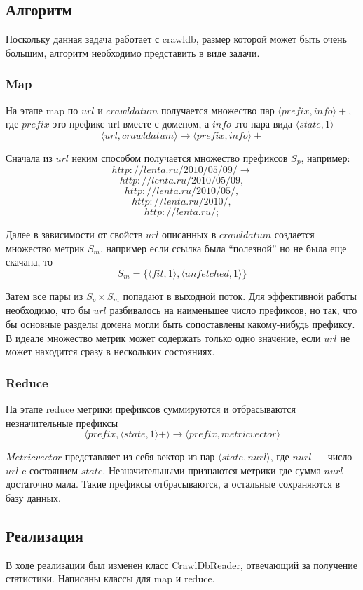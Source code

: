 \subsection*{Алгоритм}
Поскольку данная задача работает с crawldb, размер которой может быть очень большим, алгоритм необходимо представить в виде   задачи.

\subsubsection*{Map}
На этапе map по $url$ и $crawldatum$ получается множество пар $\langle prefix,info\rangle+$, где $prefix$ это префикс url вместе с доменом, а $info$ это пара вида $\langle state,1\rangle$
$$\langle url, crawldatum \rangle \rightarrow \langle prefix,info\rangle+ $$

Сначала из $url$ неким способом получается множество префиксов $S_{p}$, например:
$$ http://lenta.ru/2010/05/09/ \rightarrow $$
$$ http://lenta.ru/2010/05/09, $$
$$ http://lenta.ru/2010/05/, $$
$$ http://lenta.ru/2010/, $$
$$ http://lenta.ru/; $$


Далее в зависимости от свойств $url$ описанных в $crawldatum$ создается множество метрик $S_{m}$, например если ссылка была ``полезной'' но не была еще скачана, то $$ S_{m}=\{\langle fit,1\rangle, \langle unfetched,1\rangle\}$$

Затем все пары из $S_{p} \times S_{m}$ попадают в выходной поток. Для эффективной работы необходимо, что бы $url$ разбивалось на наименьшее число префиксов, но так, что бы основные разделы домена могли быть сопоставлены какому-нибудь префиксу. В идеале множество метрик может содержать только одно значение, если $url$ не может находится сразу в нескольких состояниях.
\subsubsection*{Reduce}
На этапе reduce метрики префиксов суммируются и отбрасываются незначительные префиксы
$$\langle prefix,\langle state,1\rangle+\rangle \rightarrow \langle prefix,metricvector\rangle$$

$Metricvector$ представляет из себя вектор из пар $\langle state, nurl \rangle$, где $nurl$ --- число $url$ c состоянием $state$.
Незначительными признаются метрики где сумма $nurl$ достаточно мала. Такие префиксы отбрасываются, а остальные сохраняются в базу данных.

\subsection*{Реализация}
В ходе реализации был изменен класс CrawlDbReader, отвечающий за получение статистики. Написаны классы для map и reduce.

